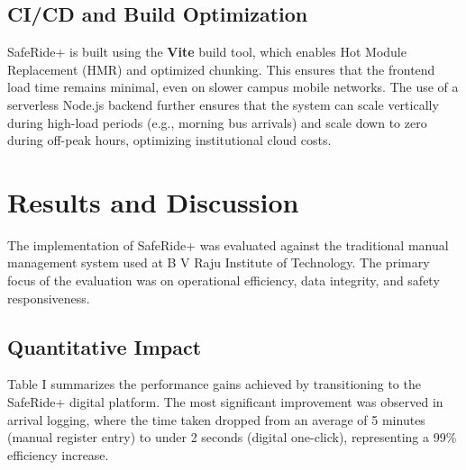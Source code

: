 \documentclass[conference]{IEEEtran}
\begin{document}
\subsection{CI/CD and Build Optimization}
SafeRide+ is built using the \textbf{Vite} build tool, which enables Hot Module Replacement (HMR) and optimized chunking. This ensures that the frontend load time remains minimal, even on slower campus mobile networks. The use of a serverless Node.js backend further ensures that the system can scale vertically during high-load periods (e.g., morning bus arrivals) and scale down to zero during off-peak hours, optimizing institutional cloud costs.

\section{Results and Discussion}
The implementation of SafeRide+ was evaluated against the traditional manual management system used at B V Raju Institute of Technology. The primary focus of the evaluation was on operational efficiency, data integrity, and safety responsiveness.

\subsection{Quantitative Impact}
Table I summarizes the performance gains achieved by transitioning to the SafeRide+ digital platform. The most significant improvement was observed in arrival logging, where the time taken dropped from an average of 5 minutes (manual register entry) to under 2 seconds (digital one-click), representing a 99\% efficiency increase.

\begin{table}[H]
\caption{SafeRide+ vs. Manual System Performance}
\centering
{}
\end{table}
\end{document}
